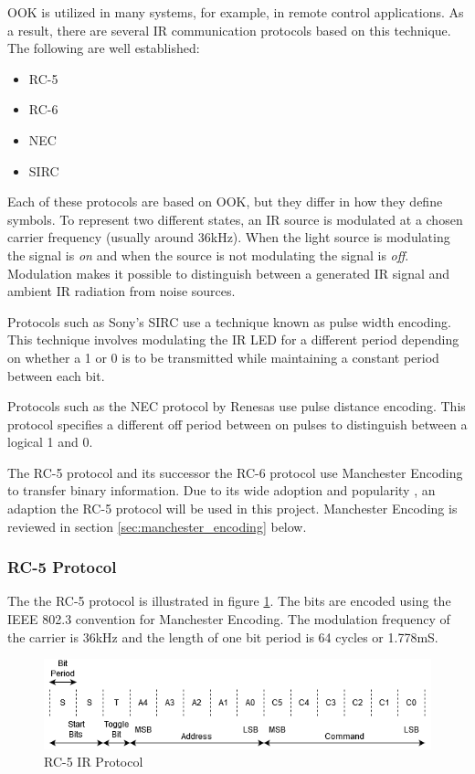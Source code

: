 OOK is utilized in many systems, for example, in remote control applications. As a result, there are several IR communication protocols based on this technique. The following are well established:

\begin{itemize}
	\item RC-5
	\item RC-6
	\item NEC
	\item SIRC
\end{itemize}

Each of these protocols are based on OOK, but they differ in how they define symbols. To represent two different states, an IR source is modulated at a chosen carrier frequency (usually around 36kHz). When the light source is modulating the signal is \textit{on} and when the source is not modulating the signal is \textit{off}.  Modulation makes it possible to distinguish between a generated IR signal and ambient IR radiation from noise sources.

Protocols such as Sony's SIRC use a technique known as pulse width encoding. This technique involves modulating the IR LED for a different period depending on whether a 1 or 0 is to be transmitted while maintaining a constant period between each bit.

Protocols such as the NEC protocol by Renesas use pulse distance encoding. This protocol specifies a different off period between on pulses to distinguish between a logical 1 and 0.

The RC-5 protocol and its successor the RC-6 protocol use Manchester Encoding to transfer binary information. Due to its wide adoption and popularity \cite{rudrappa2009}, an adaption the RC-5 protocol will be used in this project. Manchester Encoding is reviewed in section \ref{sec:manchester_encoding} below.

\subsubsection{RC-5 Protocol}
\label{sec:rc_5_protocol}
The the RC-5 protocol is illustrated in figure \ref{fig:rc_5_protocol}. The bits are encoded using the IEEE 802.3 convention for Manchester Encoding. The modulation frequency of the carrier is 36kHz and the length of one bit period is 64 cycles or 1.778mS\cite{Perme2007}.

\begin{figure}[H]
	\centering
	\includegraphics[width=0.8\linewidth]{figures/litreview/rc5_protocol.png}
	\caption{RC-5 IR Protocol}
	\label{fig:rc_5_protocol}
\end{figure}

